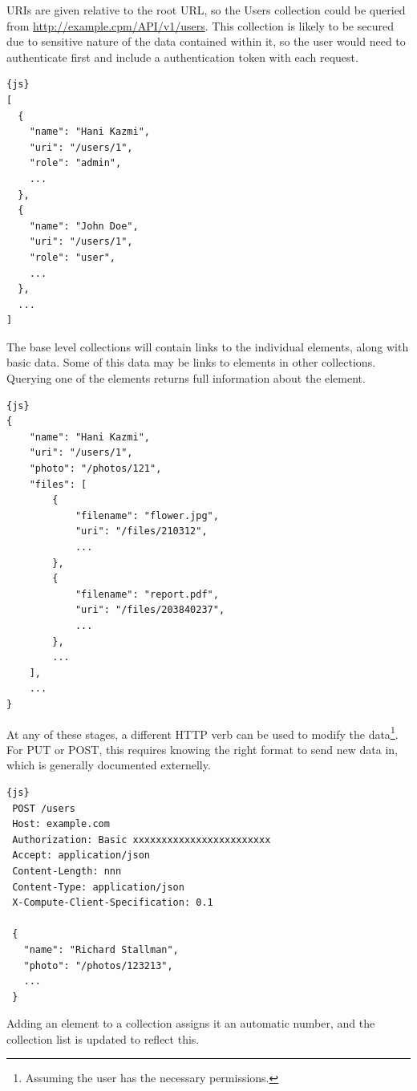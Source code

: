 URIs are given relative to the root URL, so the Users collection could be queried from \url{http://example.cpm/API/v1/users}. This collection is likely to be secured due to sensitive nature of the data contained within it, so the user would need to authenticate first and include a authentication token with each request.

\begin{code}
\begin{lstlisting}[frame=lines]{js}
[
  {
  	"name": "Hani Kazmi",
  	"uri": "/users/1",
  	"role": "admin",
  	...
  },
  {
  	"name": "John Doe",
  	"uri": "/users/1",
  	"role": "user",
  	...
  },
  ...
]
\end{lstlisting}
\end{code}

The base level collections will contain links to the individual elements, along with basic data. Some of this data may be links to elements in other collections. Querying one of the elements returns full information about the element.

\begin{code}
\begin{lstlisting}[frame=lines]{js}
{
	"name": "Hani Kazmi",
	"uri": "/users/1",
	"photo": "/photos/121",
	"files": [
	    {
	    	"filename": "flower.jpg",
	    	"uri": "/files/210312",
	    	...
	    },
	    {
	    	"filename": "report.pdf",
	    	"uri": "/files/203840237",
	    	...
	    },
	    ...
	],
	...
}
\end{lstlisting}
\end{code}

At any of these stages, a different HTTP verb can be used to modify the data\footnote{Assuming the user has the necessary permissions.}. For PUT or POST, this requires knowing the right format to send new data in, which is generally documented externelly.

\begin{code}
\begin{lstlisting}[frame=lines]{js}
 POST /users
 Host: example.com
 Authorization: Basic xxxxxxxxxxxxxxxxxxxxxxxx
 Accept: application/json
 Content-Length: nnn
 Content-Type: application/json
 X-Compute-Client-Specification: 0.1
 
 {
   "name": "Richard Stallman",
   "photo": "/photos/123213",
   ...
 }
\end{lstlisting}
\end{code}

Adding an element to a collection assigns it an automatic number, and the collection list is updated to reflect this.

